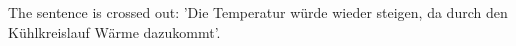 The sentence is crossed out: 'Die Temperatur würde wieder steigen, da durch den Kühlkreislauf Wärme dazukommt'.